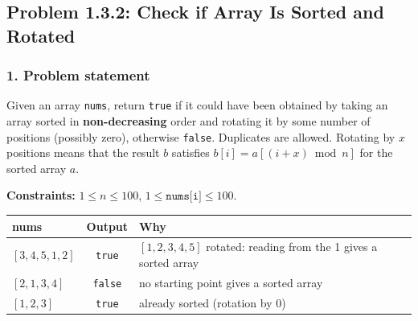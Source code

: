 \subsection{Problem 1.3.2: Check if Array Is Sorted and Rotated}


\subsubsection*{1. Problem statement}

Given an array \texttt{nums}, return \texttt{true} if it could have been obtained by taking an array sorted in \textbf{non-decreasing} order and rotating it by some number of positions (possibly zero), otherwise \texttt{false}. Duplicates are allowed. Rotating by $x$ positions means that the result $b$ satisfies $b[i] = a[(i + x) \bmod n]$ for the sorted array $a$.

\textbf{Constraints:} $1 \le n \le 100$, \; $1 \le \texttt{nums[i]} \le 100$.

\begin{table}[H]
\centering\small
\begin{tabular}{@{}lcl@{}}
\toprule
\textbf{nums} & \textbf{Output} & \textbf{Why} \\
\midrule
$[3,4,5,1,2]$ & \texttt{true} & $[1,2,3,4,5]$ rotated: reading from the 1 gives a sorted array \\
$[2,1,3,4]$ & \texttt{false} & no starting point gives a sorted array \\
$[1,2,3]$ & \texttt{true} & already sorted (rotation by 0) \\
\bottomrule
\end{tabular}
\end{table}

